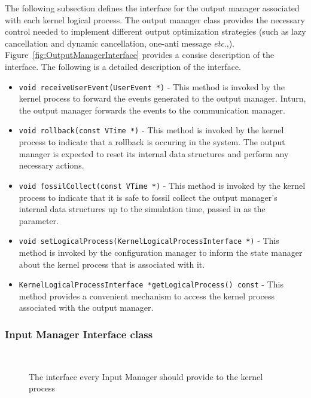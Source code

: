 The following subsection defines the interface for the output manager
associated with each kernel logical process. The output manager class
provides the necessary control needed to implement different output
optimization strategies (such as lazy cancellation and dynamic
cancellation, one-anti message \emph{etc}.,).
Figure~\ref{fig:OutputManagerInterface} provides a consise description of
the interface. The following is a detailed description of the interface.

\begin{itemize}
\item {\tt void receiveUserEvent(UserEvent *)} - This method is invoked by 
  the kernel process to forward the events generated to the output
  manager. Inturn, the output manager forwards the events to the
  communication manager. 

\item {\tt void rollback(const VTime *)} - This method is invoked by the
  kernel process to indicate that a rollback is occuring in the
  system. The output manager is expected to reset its internal data
  structures and perform any necessary actions. 
  
\item {\tt void fossilCollect(const VTime *)} - This method is invoked by
  the kernel process to indicate that it is safe to fossil collect the
  output manager's internal data structures up to the simulation time,
  passed in as the parameter.

\item {\tt void setLogicalProcess(KernelLogicalProcessInterface *)} - This
  method is invoked by the configuration manager to inform the state
  manager about the kernel process that is associated with it. 

\item {\tt KernelLogicalProcessInterface *getLogicalProcess() const} -
  This method provides a convenient mechanism to access the kernel process
  associated with the output manager.

\end{itemize}

\subsubsection{Input Manager Interface class}

\begin{figure*}
\begin{center}
\ 
\end{center}
\caption{The interface every Input Manager should provide to the kernel
  process}\label{fig:InputManagerInterface}
\end{figure*}

